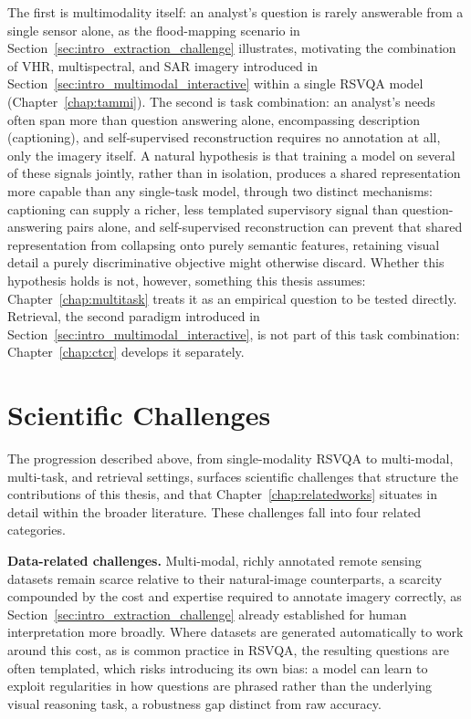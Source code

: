 The first is multimodality itself: an analyst's question is rarely answerable from a single sensor alone, as the flood-mapping scenario in Section~\ref{sec:intro_extraction_challenge} illustrates, motivating the combination of VHR, multispectral, and SAR imagery introduced in Section~\ref{sec:intro_multimodal_interactive} within a single RSVQA model (Chapter~\ref{chap:tammi}). The second is task combination: an analyst's needs often span more than question answering alone, encompassing description (captioning), and self-supervised reconstruction requires no annotation at all, only the imagery itself. A natural hypothesis is that training a model on several of these signals jointly, rather than in isolation, produces a shared representation more capable than any single-task model, through two distinct mechanisms: captioning can supply a richer, less templated supervisory signal than question-answering pairs alone, and self-supervised reconstruction can prevent that shared representation from collapsing onto purely semantic features, retaining visual detail a purely discriminative objective might otherwise discard. Whether this hypothesis holds is not, however, something this thesis assumes: Chapter~\ref{chap:multitask} treats it as an empirical question to be tested directly. Retrieval, the second paradigm introduced in Section~\ref{sec:intro_multimodal_interactive}, is not part of this task combination: Chapter~\ref{chap:ctcr} develops it separately.
\section{Scientific Challenges}
\label{sec:intro_challenges}
 
The progression described above, from single-modality RSVQA to multi-modal, multi-task, and retrieval settings, surfaces scientific challenges that structure the contributions of this thesis, and that Chapter~\ref{chap:relatedworks} situates in detail within the broader literature. These challenges fall into four related categories.
 
\textbf{Data-related challenges.} Multi-modal, richly annotated remote sensing datasets remain scarce relative to their natural-image counterparts, a scarcity compounded by the cost and expertise required to annotate imagery correctly, as Section~\ref{sec:intro_extraction_challenge} already established for human interpretation more broadly. Where datasets are generated automatically to work around this cost, as is common practice in RSVQA, the resulting questions are often templated, which risks introducing its own bias: a model can learn to exploit regularities in how questions are phrased rather than the underlying visual reasoning task, a robustness gap distinct from raw accuracy.
 
